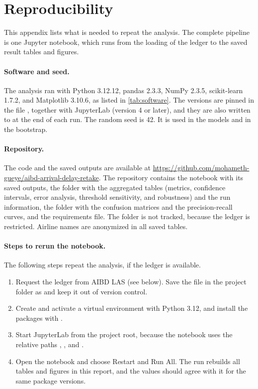 \section{Reproducibility}\label{app:reproducibility}

This appendix lists what is needed to repeat the analysis. The complete pipeline is one Jupyter notebook, which runs from the loading of the ledger to the saved result tables and figures.

\paragraph{Software and seed.} The analysis ran with Python 3.12.12, pandas 2.3.3, NumPy 2.3.5, scikit-learn 1.7.2, and Matplotlib 3.10.6, as listed in \cref{tab:software}. The versions are pinned in the file , together with JupyterLab (version 4 or later), and they are also written to  at the end of each run. The random seed is 42. It is used in the models and in the bootstrap.

\paragraph{Repository.} The code and the saved outputs are available at \url{https://github.com/mohameth-gueye/aibd-arrival-delay-retake}. The repository contains the notebook with its saved outputs, the folder  with the aggregated tables (metrics, confidence intervals, error analysis, threshold sensitivity, and robustness) and the run information, the folder  with the confusion matrices and the precision-recall curves, and the requirements file. The folder  is not tracked, because the ledger is restricted. Airline names are anonymized in all saved tables.

\paragraph{Steps to rerun the notebook.} The following steps repeat the analysis, if the ledger is available.
\begin{enumerate}[label=\arabic*.,leftmargin=*,itemsep=2pt]
  \item Request the ledger from AIBD LAS (see below). Save the file in the project folder as  and keep it out of version control.
  \item Create and activate a virtual environment with Python 3.12, and install the packages with .
  \item Start JupyterLab from the project root, because the notebook uses the relative paths , , and .
  \item Open the notebook and choose Restart and Run All. The run rebuilds all tables and figures in this report, and the values should agree with it for the same package versions.
\end{enumerate}

